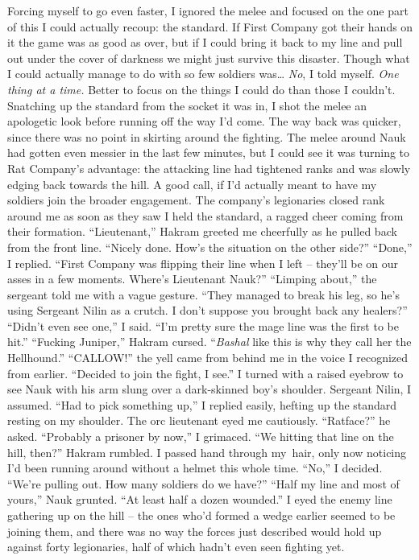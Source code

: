 \documentclass[12pt, openany]{book}
\begin{document}
Forcing myself to go even faster, I ignored the melee and focused on the one part of this I could actually recoup: the standard. If First Company got their hands on it the game was as good as over, but if I could bring it back to my line and pull out under the cover of darkness we might just survive this disaster. Though what I could actually manage to do with so few soldiers was… \textit{No}, I told myself. \textit{One thing at a time. }Better to focus on the things I could do than those I couldn’t. Snatching up the standard from the socket it was in, I shot the melee an apologetic look before running off the way I’d come. The way back was quicker, since there was no point in skirting around the fighting. The melee around Nauk had gotten even messier in the last few minutes, but I could see it was turning to Rat Company’s advantage: the attacking line had tightened ranks and was slowly edging back towards the hill. A good call, if I’d actually meant to have my soldiers join the broader engagement. The company’s legionaries closed rank around me as soon as they saw I held the standard, a ragged cheer coming from their formation.
“Lieutenant,” Hakram greeted me cheerfully as he pulled back from the front line. “Nicely done. How’s the situation on the other side?”
“Done,” I replied. “First Company was flipping their line when I left – they’ll be on our asses in a few moments. Where’s Lieutenant Nauk?”
“Limping about,” the sergeant told me with a vague gesture. “They managed to break his leg, so he’s using Sergeant Nilin as a crutch. I don’t suppose you brought back any healers?”
“Didn’t even see one,” I said. “I’m pretty sure the mage line was the first to be hit.”
“Fucking Juniper,” Hakram cursed. “\textit{Bashal} like this is why they call her the Hellhound.”
“CALLOW!” the yell came from behind me in the voice I recognized from earlier. “Decided to join the fight, I see.”
I turned with a raised eyebrow to see Nauk with his arm slung over a dark-skinned boy’s shoulder. Sergeant Nilin, I assumed.
“Had to pick something up,” I replied easily, hefting up the standard resting on my shoulder. The orc lieutenant eyed me cautiously.
“Ratface?” he asked.
“Probably a prisoner by now,” I grimaced.
“We hitting that line on the hill, then?” Hakram rumbled.
I passed hand through my hair, only now noticing I’d been running around without a helmet this whole time.
“No,” I decided. “We’re pulling out. How many soldiers do we have?”
“Half my line and most of yours,” Nauk grunted. “At least half a dozen wounded.”
I eyed the enemy line gathering up on the hill – the ones who’d formed a wedge earlier seemed to be joining them, and there was no way the forces just described would hold up against forty legionaries, half of which hadn’t even seen fighting yet.
\end{document}
